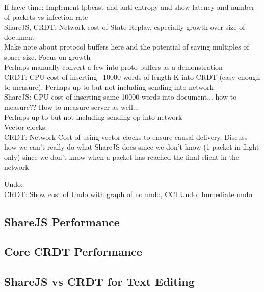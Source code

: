 \documentclass[12pt,a4paper,twoside,openright]{report}
\begin{document}
			If have time: Implement lpbcast and anti-entropy and show latency and number of packets vs infection rate\\
			
			ShareJS, CRDT: Network cost of State Replay, especially growth over size of document\\
							Make note about protocol buffers here and the potential of saving multiples of space size. Focus on growth	\\
							Perhaps manually convert a few into proto buffers as a demonstration\\
			
			
			CRDT: 	 CPU cost of inserting ~10000 words of length K into CRDT (easy enough to measure). Perhaps up to but not including sending into network\\
			ShareJS: CPU cost of inserting same 10000 words into document... how to measure?? How to measure server as well...\\
							Perhaps up to but not including sending op into network\\
			
			Vector clocks:\\
				CRDT: Network Cost of using vector clocks to ensure causal delivery. Discuss how we can't really do what ShareJS does since we don't know (1 packet in flight only) since we don't know when a packet has reached the final client in the network
							
			Undo:\\
				CRDT: Show cost of Undo with graph of no undo, CCI Undo, Immediate undo
				
							
							
			
			
			
	
		\subsection{ShareJS Performance}
		
			\subsubsection{}
		
		\subsection{Core CRDT Performance}
		
		\subsection{ShareJS vs CRDT for Text Editing}
		
\end{document}
